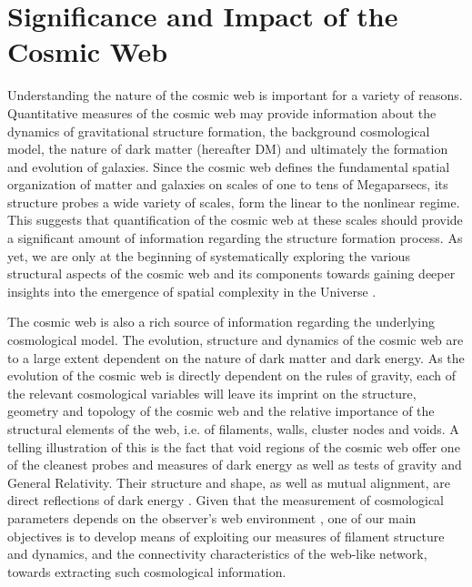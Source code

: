 \section{Significance and Impact of the Cosmic Web}
Understanding the nature of the cosmic web is important for a variety of reasons. Quantitative measures of the cosmic web 
may provide information about the dynamics of gravitational structure formation, the background cosmological model, the 
nature of dark matter (hereafter DM) and ultimately the formation and evolution of galaxies. Since the cosmic web defines the fundamental spatial organization of matter and galaxies on scales of one to tens of Megaparsecs, its structure probes a wide variety of scales, form the linear to the nonlinear regime. This suggests that quantification of the cosmic web at these scales should provide a significant amount of 
information regarding the structure formation process. As yet, we are only at the beginning of systematically exploring the various 
structural aspects of the cosmic web and its components towards gaining deeper insights into the emergence of spatial 
complexity in the Universe \citep[see e.g.][]{Cautun2014a}. 

The cosmic web is also a rich source of information regarding the underlying cosmological model. The evolution, structure and dynamics of the 
cosmic web are to a large extent dependent on the nature of dark matter and dark energy. As the evolution of the cosmic web 
is directly dependent on the rules of gravity, each of the relevant cosmological variables will leave its imprint on the 
structure, geometry and topology of the cosmic web and the relative importance of the structural elements of the 
web, i.e. of filaments, walls, cluster nodes and voids. A telling illustration of this is the fact that  void regions of the cosmic web offer one of the cleanest probes and measures of dark energy as well as tests of gravity and General Relativity. Their structure and shape, as well as mutual alignment, are direct 
reflections of dark energy \citep{Park2007,Platen2008a,Lavaux2010,Lavaux2012,Bos2012,Sutter2014a,Pisani2015}. Given that the measurement of cosmological parameters depends on the observer's web environment \citep[e.g.][]{Wojtak2014}, one of our 
main objectives is to develop means of exploiting our measures of filament structure and dynamics, and the connectivity 
characteristics of the web-like network, towards extracting such cosmological information. 

